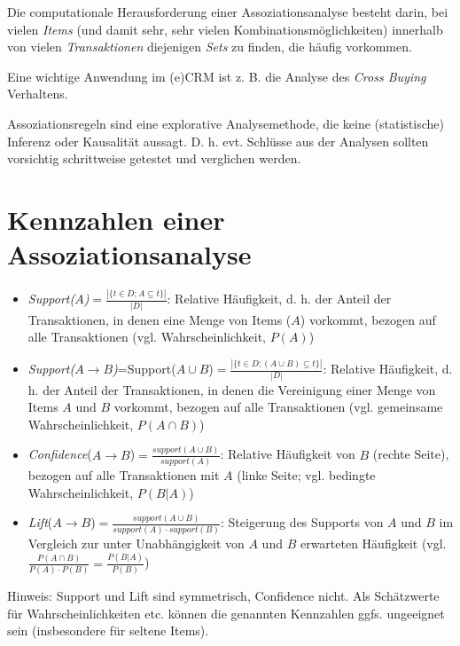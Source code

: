 \documentclass[12pt,]{book}
\providecommand{\tightlist}{%
  \setlength{\itemsep}{0pt}\setlength{\parskip}{0pt}}
\begin{document}
Die computationale Herausforderung einer Assoziationsanalyse besteht
darin, bei vielen \emph{Items} (und damit sehr, sehr vielen
Kombinationsmöglichkeiten) innerhalb von vielen \emph{Transaktionen}
diejenigen \emph{Sets} zu finden, die häufig vorkommen.

Eine wichtige Anwendung im (e)CRM ist z. B. die Analyse des \emph{Cross
Buying} Verhaltens.

Assoziationsregeln sind eine explorative Analysemethode, die keine
(statistische) Inferenz oder Kausalität aussagt. D. h. evt. Schlüsse aus
der Analysen sollten vorsichtig schrittweise getestet und verglichen
werden.

\section{Kennzahlen einer
Assoziationsanalyse}\label{kennzahlen-einer-assoziationsanalyse}

\begin{itemize}
\tightlist
\item
  \emph{Support(\(A\))}\(=\frac{|\{t\in D; A \subseteq t\}|}{|D|}\):
  Relative Häufigkeit, d. h. der Anteil der Transaktionen, in denen eine
  Menge von Items (\(A\)) vorkommt, bezogen auf alle Transaktionen (vgl.
  Wahrscheinlichkeit, \(P(A)\))
\item
  \emph{Support(\(A\rightarrow B\))}=Support(\(A\cup B\))\(=\frac{|\{t\in D; (A\cup B) \subseteq t\}|}{|D|}\):
  Relative Häufigkeit, d. h. der Anteil der Transaktionen, in denen die
  Vereinigung einer Menge von Items \(A\) und \(B\) vorkommt, bezogen
  auf alle Transaktionen (vgl. gemeinsame Wahrscheinlichkeit,
  \(P(A \cap B)\))
\item
  \emph{Confidence}(\(A \rightarrow B\))\(=\frac{support(A \cup B)}{support(A)}\):
  Relative Häufigkeit von \(B\) (rechte Seite), bezogen auf alle
  Transaktionen mit \(A\) (linke Seite; vgl. bedingte
  Wahrscheinlichkeit, \(P(B|A)\))
\item
  \emph{Lift}(\(A \rightarrow B\))\(=\frac{support(A \cup B)}{support(A) \cdot support(B)}\):
  Steigerung des Supports von \(A\) und \(B\) im Vergleich zur unter
  Unabhängigkeit von \(A\) und \(B\) erwarteten Häufigkeit (vgl.
  \(\frac{P(A\cap B)}{P(A) \cdot P(B)}=\frac{P(B|A)}{P(B)}\))
\end{itemize}

Hinweis: Support und Lift sind symmetrisch, Confidence nicht. Als
Schätzwerte für Wahrscheinlichkeiten etc. können die genannten
Kennzahlen ggfs. ungeeignet sein (insbesondere für seltene Items).
\end{document}
